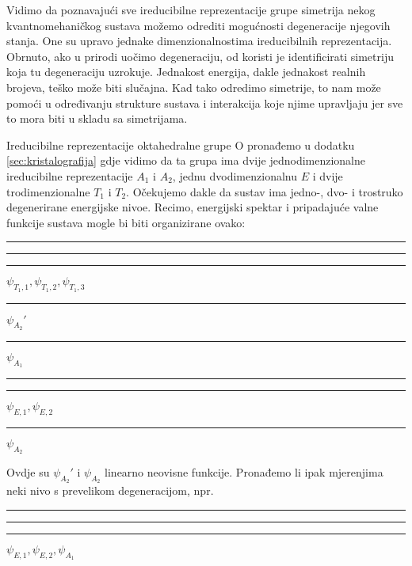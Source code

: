 Vidimo da poznavajući sve ireducibilne reprezentacije grupe simetrija nekog
kvantnomehaničkog
sustava možemo odrediti mogućnosti degeneracije njegovih stanja.
One su upravo jednake dimenzionalnostima ireducibilnih reprezentacija.
Obrnuto, ako u prirodi uočimo degeneraciju, od koristi je identificirati
simetriju koja tu degeneraciju uzrokuje. Jednakost energija, dakle jednakost
realnih brojeva, teško može biti slučajna. Kad tako odredimo simetrije,
to nam može pomoći u određivanju strukture sustava i interakcija koje
njime upravljaju jer sve to mora biti u skladu sa simetrijama.

\begin{primjer}

Ireducibilne reprezentacije oktahedralne grupe O pronađemo
u dodatku \ref{sec:kristalografija} gdje vidimo 
da ta grupa ima dvije jednodimenzionalne
ireducibilne reprezentacije $A_1$ i $A_2$, jednu
dvodimenzionalnu $E$ i dvije trodimenzionalne $T_1$ i  $T_2$.
Očekujemo dakle da sustav ima jedno-, dvo- i trostruko degenerirane
energijske nivoe.
Recimo, energijski spektar i pripadajuće valne funkcije sustava mogle
bi biti organizirane ovako:

\hspace*{2cm}
\rule{3cm}{1pt}\hspace*{-3cm}%
\rule[2pt]{3cm}{1pt}\hspace*{-3cm}%
\rule[4pt]{3cm}{1pt}\hspace{12pt}%
$\psi_{T_1,1}, \psi_{T_1,2}, \psi_{T_1,3}$

\hspace*{2cm}
\rule{3cm}{1pt}\hspace*{12pt}%
$\psi_{A_2}'$

\hspace*{2cm}
\rule{3cm}{1pt}\hspace*{12pt}%
$\psi_{A_1}$

\hspace*{2cm}
\rule{3cm}{1pt}\hspace*{-3cm}%
\rule[2pt]{3cm}{1pt}\hspace*{12pt}%
$\psi_{E,1}, \psi_{E,2}$

\hspace*{2cm}
\rule{3cm}{1pt}\hspace*{12pt}%
$\psi_{A_2}$

Ovdje su $\psi_{A_2}'$ i $\psi_{A_2}$ linearno neovisne funkcije.
Pronađemo li ipak mjerenjima neki nivo s prevelikom degeneracijom,
npr.

\hspace*{2cm}
\rule{3cm}{1pt}\hspace*{-3cm}%
\rule[2pt]{3cm}{1pt}\hspace*{-3cm}%
\rule[4pt]{3cm}{1pt}\hspace{12pt}%
$\psi_{E,1}, \psi_{E,2}, \psi_{A_1}$


\end{primjer}
